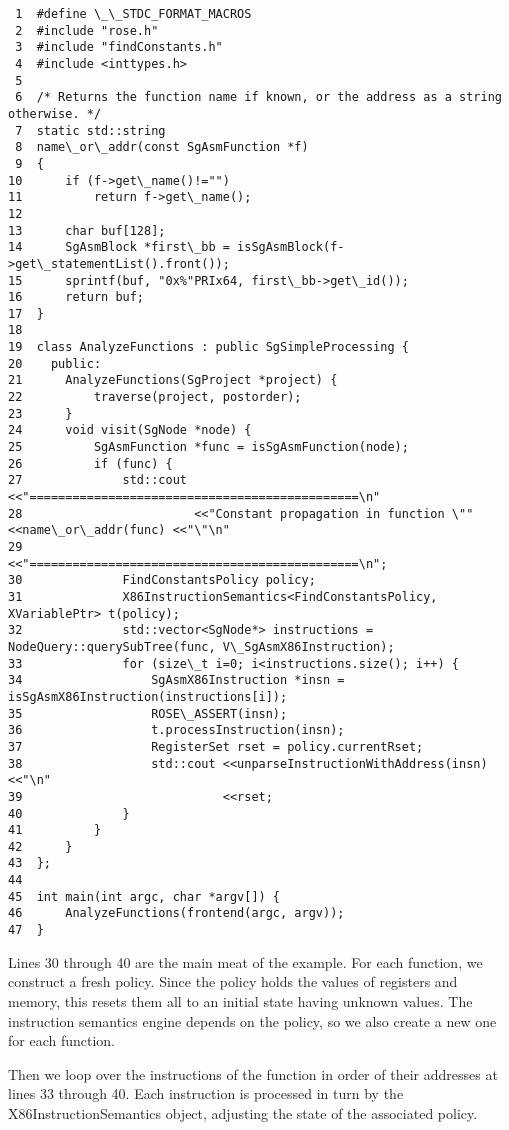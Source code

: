 \begin{verbatim}
 1  #define \_\_STDC_FORMAT_MACROS
 2  #include "rose.h"
 3  #include "findConstants.h"
 4  #include <inttypes.h>
 5
 6  /* Returns the function name if known, or the address as a string otherwise. */
 7  static std::string
 8  name\_or\_addr(const SgAsmFunction *f)
 9  {
10      if (f->get\_name()!="")
11          return f->get\_name();
12  
13      char buf[128];
14      SgAsmBlock *first\_bb = isSgAsmBlock(f->get\_statementList().front());
15      sprintf(buf, "0x%"PRIx64, first\_bb->get\_id());
16      return buf;
17  }
18
19  class AnalyzeFunctions : public SgSimpleProcessing {
20    public:
21      AnalyzeFunctions(SgProject *project) {
22          traverse(project, postorder);
23      }
24      void visit(SgNode *node) {
25          SgAsmFunction *func = isSgAsmFunction(node);
26          if (func) {
27              std::cout <<"==============================================\n"
28                        <<"Constant propagation in function \"" <<name\_or\_addr(func) <<"\"\n"
29                        <<"==============================================\n";
30              FindConstantsPolicy policy;
31              X86InstructionSemantics<FindConstantsPolicy, XVariablePtr> t(policy);
32              std::vector<SgNode*> instructions = NodeQuery::querySubTree(func, V\_SgAsmX86Instruction);
33              for (size\_t i=0; i<instructions.size(); i++) {
34                  SgAsmX86Instruction *insn = isSgAsmX86Instruction(instructions[i]);
35                  ROSE\_ASSERT(insn);
36                  t.processInstruction(insn);
37                  RegisterSet rset = policy.currentRset;
38                  std::cout <<unparseInstructionWithAddress(insn) <<"\n"
39                            <<rset;
40              }
41          }
42      }
43  };
44
45  int main(int argc, char *argv[]) {
46      AnalyzeFunctions(frontend(argc, argv));
47  }
\end{verbatim}

Lines 30 through 40 are the main meat of the example. For each
function, we construct a fresh policy. Since the policy holds the
values of registers and memory, this resets them all to an initial
state having unknown values.  The instruction semantics engine depends
on the policy, so we also create a new one for each function.

Then we loop over the instructions of the function in order of their
addresses at lines 33 through 40.  Each instruction is processed in
turn by the X86InstructionSemantics object, adjusting the state of the
associated policy.

